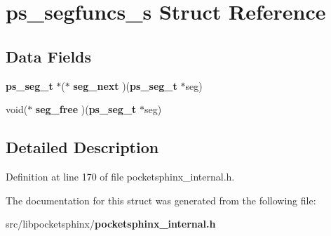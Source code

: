 \section{ps\-\_\-segfuncs\-\_\-s Struct Reference}
\label{structps__segfuncs__s}
\subsection*{Data Fields}
\begin{DoxyCompactItemize}
\item 
{\bf ps\-\_\-seg\-\_\-t} $\ast$($\ast$ {\bfseries seg\-\_\-next} )({\bf ps\-\_\-seg\-\_\-t} $\ast$seg)\label{structps__segfuncs__s_a8d9d7ccdb757620830d352d5fece4119}

\item 
void($\ast$ {\bfseries seg\-\_\-free} )({\bf ps\-\_\-seg\-\_\-t} $\ast$seg)\label{structps__segfuncs__s_abbc6c03c53212c4b973f3a0e4121e2ba}

\end{DoxyCompactItemize}


\subsection{Detailed Description}


Definition at line 170 of file pocketsphinx\-\_\-internal.\-h.



The documentation for this struct was generated from the following file\-:\begin{DoxyCompactItemize}
\item 
src/libpocketsphinx/{\bf pocketsphinx\-\_\-internal.\-h}\end{DoxyCompactItemize}
